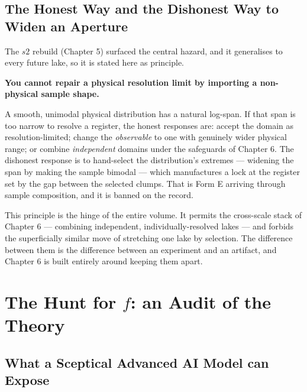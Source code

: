 \documentclass[11pt, letterpaper, openany]{book}
\begin{document}
\section{The Honest Way and the Dishonest Way to Widen an Aperture}

The $s2$ rebuild (Chapter 5) surfaced the central hazard, and it generalises to every future
lake, so it is stated here as principle.

\begin{warningbox}
\textbf{You cannot repair a physical resolution limit by importing a non-physical sample shape.}

\medskip
\noindent A smooth, unimodal physical distribution has a natural log-span. If that span is too
narrow to resolve a register, the honest responses are: accept the domain as
resolution-limited; change the \emph{observable} to one with genuinely wider physical range; or
combine \emph{independent} domains under the safeguards of Chapter 6. The dishonest response is
to hand-select the distribution's extremes --- widening the span by making the sample bimodal
--- which manufactures a lock at the register set by the gap between the selected clumps. That
is Form E arriving through sample composition, and it is banned on the record.
\end{warningbox}

This principle is the hinge of the entire volume. It permits the cross-scale stack of Chapter 6
--- combining independent, individually-resolved lakes --- and forbids the superficially similar
move of stretching one lake by selection. The difference between them is the difference between
an experiment and an artifact, and Chapter 6 is built entirely around keeping them apart.

\chapter{The Hunt for $f$: an Audit of the Theory}
\section*{What a Sceptical Advanced AI Model can Expose}
\end{document}
